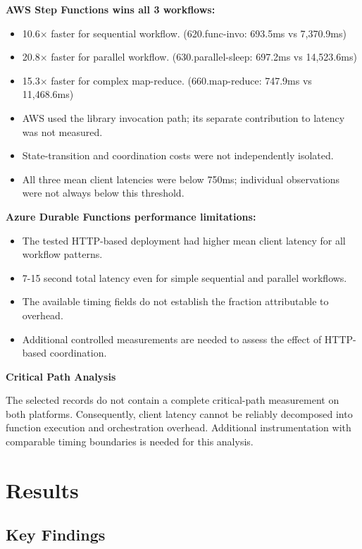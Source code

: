 \documentclass[sigconf,nonacm]{acmart}
\begin{document}
\textbf{AWS Step Functions wins all 3 workflows:}
\begin{itemize}
    \item 10.6$\times$ faster for sequential workflow. (620.func-invo: 693.5ms vs 7,370.9ms)
    \item 20.8$\times$ faster for parallel workflow. (630.parallel-sleep: 697.2ms vs 14,523.6ms)
    \item 15.3$\times$ faster for complex map-reduce. (660.map-reduce: 747.9ms vs 11,468.6ms)
    \item AWS used the library invocation path; its separate contribution to latency was not measured.
    \item State-transition and coordination costs were not independently isolated.
    \item All three mean client latencies were below 750ms; individual observations were not always below this threshold.
\end{itemize}

\textbf{Azure Durable Functions performance limitations:}
\begin{itemize}
    \item The tested HTTP-based deployment had higher mean client latency for all workflow patterns.
    \item 7-15 second total latency even for simple sequential and parallel workflows.
    \item The available timing fields do not establish the fraction attributable to overhead.
    \item Additional controlled measurements are needed to assess the effect of HTTP-based coordination.
\end{itemize}

\textbf{Critical Path Analysis} 

The selected records do not contain a complete critical-path measurement on both platforms. Consequently, client latency cannot be reliably decomposed into function execution and orchestration overhead. Additional instrumentation with comparable timing boundaries is needed for this analysis.

\section{Results}



\subsection{Key Findings}
\end{document}
